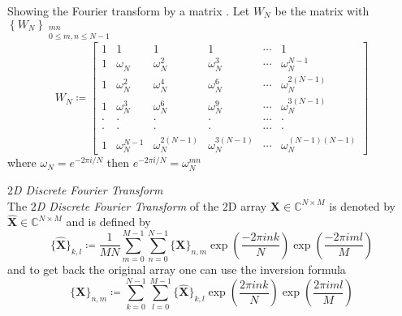 \begin{Rem}
    Showing the Fourier transform by a matrix \cite{Frazier1999} \cite{Bredies2018} \cite{Damelin2011}.
    Let $W_N$ be the matrix with $\left\{W_N\right\}_{\substack{mn \\ 0 \leq m,n \leq N-1}}$ 
    \begin{equation*}
        W_N \coloneqq 
        \begin{bmatrix}
            1     & 1                & 1                   & 1                   & \cdots & 1                      \\
            1     & \omega_{N}^{}    & \omega_{N}^{2}      & \omega_{N}^{3}      & \cdots & \omega_{N}^{N-1}       \\
            1     & \omega_{N}^{2}   & \omega_{N}^{4}      & \omega_{N}^{6}      & \cdots & \omega_{N}^{2(N-1)}    \\
            1     & \omega_{N}^{3}   & \omega_{N}^{6}      & \omega_{N}^{9}      & \cdots & \omega_{N}^{3(N-1)}    \\
            \cdot & \cdot            & \cdot               & \cdot               & \cdots & \cdot                  \\ 
            \cdot & \cdot            & \cdot               & \cdot               & \cdots & \cdot                  \\ 
            1     & \omega_{N}^{N-1} & \omega_{N}^{2(N-1)} & \omega_{N}^{3(N-1)} & \cdots & \omega_{N}^{(N-1)(N-1)}
            \end{bmatrix}
    \end{equation*}
    where $\omega_N = e^{-2\pi i/N}$ then $e^{-2\pi i/N} = \omega_N^{mn}$
\end{Rem}








\begin{Def}\label{def:2ddft}
    \emph{$2$D Discrete Fourier Transform}\\
    The \emph{$2$D Discrete Fourier Transform} of the $2$D array $\boldsymbol{X} \in \mathbb{C}^{N \times M}$ is denoted by 
    $\hat {\boldsymbol{X}} \in \mathbb{C}^{N \times M}$ and is defined by
    \begin{equation}\label{eq:2ddft}
        \{\hat {\boldsymbol{X}}\}_{k,l} \coloneqq \frac{1}{MN}\sum_{m=0}^{M-1}\sum_{n=0}^{N-1} \{{\boldsymbol{X}}\}_{n,m}\exp\left({\frac{-2\pi ink}{N}}\right)\exp\left({\frac{-2\pi iml}{M}}\right)
    \end{equation}
    and to get back the original array one can use the inversion formula
    \begin{equation}\label{eq:2didft}
        \{{\boldsymbol{X}}\}_{n,m} \coloneqq \sum_{k=0}^{N-1}\sum_{l=0}^{M-1}\{\hat {\boldsymbol{X}}\}_{k,l}\exp\left({\frac{2\pi ink}{N}}\right)\exp\left({\frac{2\pi iml}{M}}\right)
    \end{equation}    
\end{Def}

